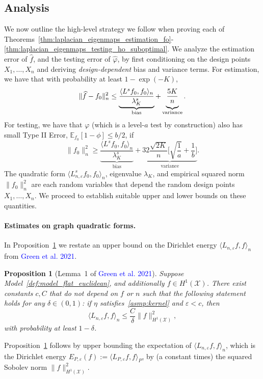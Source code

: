 \documentclass{article}
\newcommand{\1}{\mathbf{1}}
\newcommand{\mc}[1]{\mathcal{#1}}
\newcommand{\Ebb}{\mathbb{E}}
\newcommand{\dotp}[2]{\langle #1, #2 \rangle}
\newcommand{\wh}[1]{\widehat{#1}}
\theoremstyle{alden}
\theoremstyle{aldenthm}
\newtheorem{proposition}{Proposition}
\theoremstyle{definition}
\theoremstyle{remark}
\begin{document}
\subsection{Analysis}
\label{subsec:analysis}

We now outline the high-level strategy we follow when proving each of Theorems~\ref{thm:laplacian_eigenmaps_estimation_fo}-\ref{thm:laplacian_eigenmaps_testing_ho_suboptimal}. We analyze the estimation error of $\wh{f}$, and the testing error of $\wh{\varphi}$, by first conditioning on the design points $X_1,\ldots,X_n$ and deriving \emph{design-dependent} bias and variance terms. For estimation, we have that with probability at least $1 - \exp(-K)$,
\begin{equation}
\label{eqn:estimation_biasvariance}
\|\wh{f} - f_0\|_n^2 \leq \underbrace{\frac{\dotp{L^s f_0}{f_0}_n}{\lambda_{K}^s}}_{\textrm{bias}} + \underbrace{\frac{5K}{n} \vphantom{\frac{\dotp{L^s f_0}{f_0}_n}{\lambda_{K}^s}}}_{\textrm{variance}}.
\end{equation}
For testing, we have that $\varphi$ (which is a level-$a$ test by construction) also has small Type II Error, $\Ebb_{f_0}[1 - \phi] \leq b/2$, if 
\begin{equation}
\label{eqn:testing_biasvariance}
\|f_0\|_n^2 \geq  \underbrace{\frac{\dotp{L^s f_0}{f_0}_n}{\lambda_{K}^s}}_{\textrm{bias}} + \underbrace{32\frac{\sqrt{2K}}{n}\biggl[\sqrt{\frac{1}{a}} + \frac{1}{b}\biggr]}_{\textrm{variance}}.
\end{equation}
The quadratic form $\dotp{L_{n,\varepsilon}^s f_0}{f_0}_n$, eigenvalue $\lambda_{K}$, and empirical squared norm $\|f_0\|_n^2$ are each random variables that depend the random design points $X_1,\ldots,X_n$. We proceed to establish suitable upper and lower bounds on these quantities. 

\paragraph{Estimates on graph quadratic forms.}
In Proposition~\ref{prop:graph_seminorm_fo} we restate an upper bound on the Dirichlet energy $\dotp{L_{n,\varepsilon}f}{f}_n$ from \textcolor{blue}{Green et al. 2021}. 
\begin{proposition}[Lemma~1 of \textcolor{blue}{Green et al. 2021}]
	\label{prop:graph_seminorm_fo}
	Suppose Model~\ref{def:model_flat_euclidean}, and additionally $f \in H^1(\mc{X})$. There exist constants $c,C$ that do not depend on $f$ or $n$ such that the following statement holds for any $\delta \in (0,1)$: if $\eta$ satisfies~\ref{asmp:kernel} and $\varepsilon < c$, then
	\begin{equation}
	\label{eqn:graph_seminorm_fo}
	\dotp{L_{n,\varepsilon}f}{f}_n \leq \frac{C}{\delta} \|f\|_{H^1(\mc{X})}^2,
	\end{equation}
	with probability at least $1 - \delta$.
\end{proposition}
Proposition~\ref{prop:graph_seminorm_fo} follows by upper bounding the expectation of $\dotp{L_{n,\varepsilon}f}{f}_n$, which is the Dirichlet energy  $E_{P,\varepsilon}(f) := \dotp{L_{P,\varepsilon}f}{f}_P$, by (a constant times) the squared Sobolev norm $\|f\|_{H^1(\mc{X})}^2$.
\end{document}
